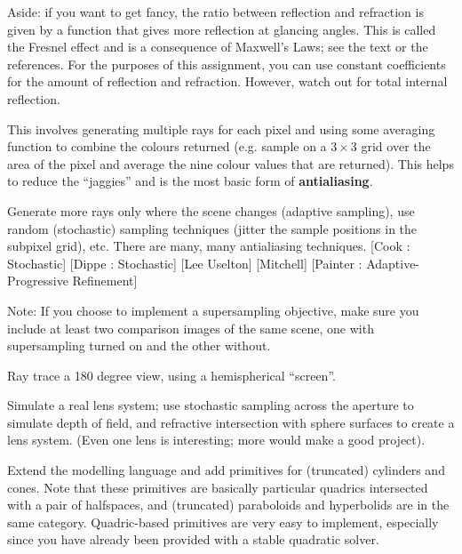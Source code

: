 \begin{description}
    Aside: if you want to get fancy, the ratio between reflection and
    refraction is given by a function that gives more reflection
    at glancing angles.   This is called the Fresnel effect and
    is a consequence of Maxwell's Laws; see the text or the references.   
    For the purposes of
    this assignment, you can use constant coefficients for the amount of 
    reflection and refraction.    However, watch out for total
    internal reflection.
\item[Supersampling:] This involves
    generating multiple rays for each pixel and using some averaging
    function to 
    combine the colours returned (e.g. sample on a $3\times 3$
    grid over the area of the pixel and
    average the nine colour values that are returned).
    This helps to reduce the ``jaggies'' and is the most basic form
    of {\bf antialiasing}.
\item[Other antialiasing methods:] Generate more rays only where the 
    scene changes (adaptive sampling), use random (stochastic) sampling 
    techniques (jitter the sample positions in the subpixel grid), etc.  
    There are many, many antialiasing techniques.
    [Cook : Stochastic] [Dippe :  Stochastic] [Lee Uselton] [Mitchell] 
    [Painter : Adaptive-Progressive Refinement]
\item Note: If you choose to implement a supersampling objective, make
    sure you include at least two comparison images of the same scene,
    one with supersampling turned on and the other without.
\item[Fisheye/Omnimax Projection:] 
    Ray trace a 180 degree view, using a hemispherical ``screen''.
\item[Spherical Lens Systems:] Simulate a real lens system; use
    stochastic sampling across the aperture to simulate depth of field,
    and refractive intersection with sphere surfaces to create a lens system.
    (Even one lens is interesting; more would make a good project).
\item[Additional primitives:] Extend the modelling language and add primitives 
    for (truncated) cylinders and cones.   
    Note that these primitives are basically
    particular quadrics intersected with a pair of halfspaces, and (truncated)
    paraboloids and hyperbolids are in the same category.   Quadric-based
    primitives are very easy to implement, especially since you have already
    been provided with a stable quadratic solver.
    

\end{description}
